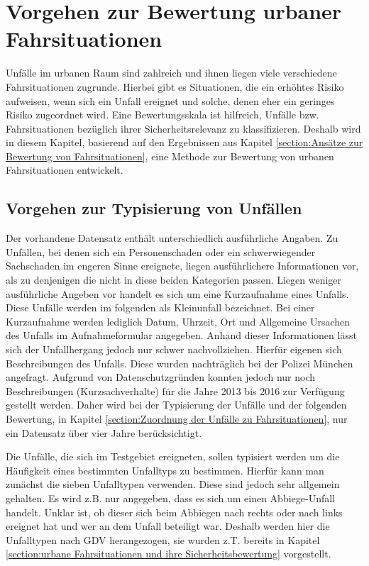 \section{Vorgehen zur Bewertung urbaner Fahrsituationen}\label{section:Bewertung urbaner Fahrsituationen}
Unfälle im urbanen Raum sind zahlreich und ihnen liegen viele verschiedene Fahrsituationen zugrunde. Hierbei gibt es Situationen, die ein erhöhtes Risiko aufweisen, wenn sich ein Unfall ereignet und solche, denen eher ein geringes Risiko zugeordnet wird. Eine Bewertungsskala ist hilfreich, Unfälle bzw. Fahrsituationen bezüglich ihrer Sicherheitsrelevanz zu klassifizieren. Deshalb wird in diesem Kapitel, basierend auf den Ergebnissen aus Kapitel \ref{section:Ansätze zur Bewertung von Fahrsituationen}, eine Methode zur Bewertung von urbanen Fahrsituationen entwickelt.

\subsection{Vorgehen zur Typisierung von Unfällen}\label{subsection:Vorgehen zur Typisierung}
Der vorhandene Datensatz enthält unterschiedlich ausführliche Angaben. Zu Unfällen, bei denen sich ein Personenschaden oder ein schwerwiegender Sachschaden im engeren Sinne ereignete, liegen ausführlichere Informationen vor, als zu denjenigen die nicht in diese beiden Kategorien passen. Liegen weniger ausführliche Angeben vor handelt es sich um eine Kurzaufnahme eines Unfalls. Diese Unfälle werden im folgenden als Kleinunfall bezeichnet. Bei einer Kurzaufnahme werden lediglich Datum, Uhrzeit, Ort und Allgemeine Ursachen des Unfalls im Aufnahmeformular angegeben. Anhand dieser Informationen lässt sich der Unfallhergang jedoch nur schwer nachvollziehen. Hierfür eigenen sich Beschreibungen des Unfalls. Diese wurden nachträglich bei der Polizei München angefragt. Aufgrund von Datenschutzgründen konnten jedoch nur noch Beschreibungen (Kurzsachverhalte) für die Jahre 2013 bis 2016 zur Verfügung gestellt werden. Daher wird bei der Typisierung der Unfälle und der folgenden Bewertung, in Kapitel \ref{section:Zuordnung der Unfälle zu Fahrsituationen}, nur ein Datensatz über vier Jahre berücksichtigt.

Die Unfälle, die sich im Testgebiet ereigneten, sollen typisiert werden um die Häufigkeit eines bestimmten Unfalltyps zu bestimmen. Hierfür kann man zunächst die sieben Unfalltypen verwenden. Diese sind jedoch sehr allgemein gehalten. Es wird z.B. nur angegeben, dass es sich um einen Abbiege-Unfall handelt. Unklar ist, ob dieser sich beim Abbiegen nach rechts oder nach links ereignet hat und wer an dem Unfall beteiligt war. Deshalb werden hier die Unfalltypen nach GDV herangezogen, sie wurden z.T. bereits in Kapitel \ref{section:urbane Fahrsituationen und ihre Sicherheitsbewertung} vorgestellt. %

